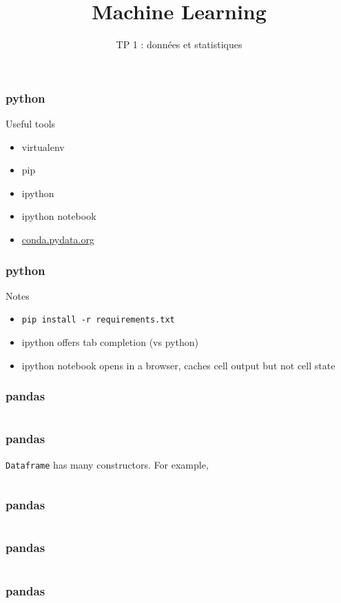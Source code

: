\documentclass{formation}
\title{Machine Learning}
\subtitle{TP 1 : données et statistiques}
\begin{document}
\maketitle

\begin{frame}
  \frametitle{python}
  Useful tools
  \begin{itemize}
  \item virtualenv
  \item pip
  \item ipython
  \item ipython notebook
  \item \url{conda.pydata.org}
  \end{itemize}
\end{frame}

\begin{frame}
  \frametitle{python}
  Notes
  \begin{itemize}
    \item \texttt{pip install -r requirements.txt}
    \item ipython offers tab completion (vs python)
    \item ipython notebook opens in a browser, caches cell output but not cell state
  \end{itemize}
\end{frame}

\begin{frame}
  \frametitle{pandas}
  \inputminted{python}{pandas_1.py}
\end{frame}

\begin{frame}
  \frametitle{pandas}
  \texttt{Dataframe} has many constructors.  For example,
  \inputminted[linenos,fontsize=\small]{python}{pandas_2.py}
\end{frame}

\begin{frame}
  \frametitle{pandas}
  \inputminted[linenos,fontsize=\small]{python}{pandas_3.py}
\end{frame}

\begin{frame}
  \frametitle{pandas}
  \inputminted[linenos,fontsize=\small]{python}{pandas_4.py}
\end{frame}

\begin{frame}
  \frametitle{pandas}
  \inputminted[linenos,fontsize=\small]{python}{pandas_5.py}
\end{frame}
\end{document}
